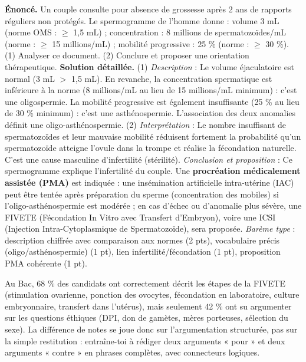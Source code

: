 \documentclass[11pt]{article}
\newcommand{\cle}[1]{{\popxbold\color{popdark}#1}}
\begin{document}
\begin{exoresolu}
\textbf{Énoncé.} Un couple consulte pour absence de grossesse après 2 ans de rapports réguliers non protégés. Le spermogramme de l'homme donne : volume 3 mL (norme OMS : $\ge$ 1,5 mL) ; concentration : 8 millions de spermatozoïdes/mL (norme : $\ge$ 15 millions/mL) ; mobilité progressive : 25 \% (norme : $\ge$ 30 \%). (1) Analyser ce document. (2) Conclure et proposer une orientation thérapeutique.
\tcblower
\textbf{Solution détaillée.}
(1) \emph{Description} : Le volume éjaculatoire est normal (3 mL $>$ 1,5 mL). En revanche, la concentration spermatique est inférieure à la norme (8 millions/mL au lieu de 15 millions/mL minimum) : c'est une \cle{oligospermie}. La mobilité progressive est également insuffisante (25 \% au lieu de 30 \% minimum) : c'est une \cle{asthénospermie}. L'association des deux anomalies définit une \cle{oligo-asthénospermie}.
(2) \emph{Interprétation} : Le nombre insuffisant de spermatozoïdes et leur mauvaise mobilité réduisent fortement la probabilité qu'un spermatozoïde atteigne l'ovule dans la trompe et réalise la fécondation naturelle. C'est une cause masculine d'\cle{infertilité} (stérilité).
\emph{Conclusion et proposition} : Ce spermogramme explique l'infertilité du couple. Une \textbf{procréation médicalement assistée (PMA)} est indiquée : une \cle{insémination artificielle intra-utérine (IAC)} peut être tentée après préparation du sperme (concentration des mobiles) si l'oligo-asthénospermie est modérée ; en cas d'échec ou d'anomalie plus sévère, une \cle{FIVETE} (Fécondation In Vitro avec Transfert d'Embryon), voire une ICSI (Injection Intra-Cytoplasmique de Spermatozoïde), sera proposée.
\emph{Barème type} : description chiffrée avec comparaison aux normes (2 pts), vocabulaire précis (oligo/asthénospermie) (1 pt), lien infertilité/fécondation (1 pt), proposition PMA cohérente (1 pt).
\end{exoresolu}

\begin{exemplebox}
Au Bac, 68 \% des candidats ont correctement décrit les étapes de la FIVETE (stimulation ovarienne, ponction des ovocytes, fécondation en laboratoire, culture embryonnaire, transfert dans l'utérus), mais seulement 42 \% ont su argumenter sur les questions éthiques (DPI, don de gamètes, mères porteuses, sélection du sexe). La différence de notes se joue donc sur l'argumentation structurée, pas sur la simple restitution : entraîne-toi à rédiger deux arguments « pour » et deux arguments « contre » en phrases complètes, avec connecteurs logiques.
\end{exemplebox}
\end{document}
